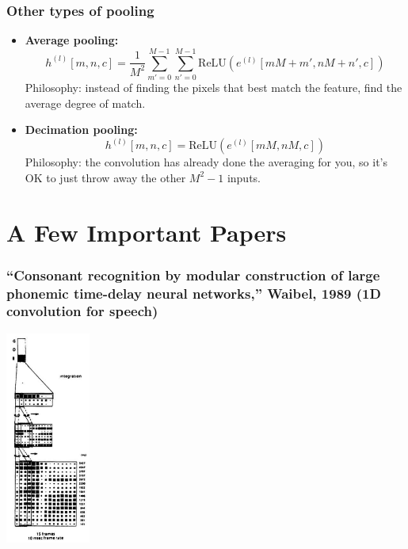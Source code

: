 \documentclass{beamer}
\begin{document}
\begin{frame}
  \frametitle{Other types of pooling}
  \begin{itemize}
  \item {\bf Average pooling:}
    \begin{displaymath}
      h^{(l)}[m,n,c] = \frac{1}{M^2}\sum_{m'=0}^{M-1}\sum_{n'=0}^{M-1} \mbox{ReLU}\left(e^{(l)}[mM+m',nM+n',c]\right)
    \end{displaymath}
    Philosophy: instead of finding the pixels that best match the feature,
    find the average degree of match.
  \item {\bf Decimation pooling:}
    \begin{displaymath}
      h^{(l)}[m,n,c] = \mbox{ReLU}\left(e^{(l)}[mM,nM,c]\right)
    \end{displaymath}
    Philosophy: the convolution has already done the averaging for you, so
    it's OK to just  throw away the other $M^2-1$ inputs.
  \end{itemize}
\end{frame}

\section[Papers]{A Few Important Papers}
\setcounter{subsection}{1}

\begin{frame}
  \frametitle{``Consonant recognition by modular construction of large
    phonemic time-delay neural networks,'' Waibel, 1989 (1D
    convolution for speech)}
  \centerline{\includegraphics[height=2.75in]{figs/waibel1989.png}}
\end{frame}
\end{document}
